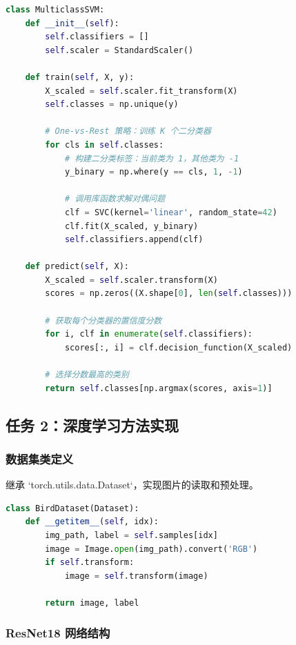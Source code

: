 \documentclass[UTF8]{ctexart}
\begin{document}
\begin{lstlisting}[language=Python, caption=多分类 SVM 实现]
class MulticlassSVM:
    def __init__(self):
        self.classifiers = []
        self.scaler = StandardScaler()

    def train(self, X, y):
        X_scaled = self.scaler.fit_transform(X)
        self.classes = np.unique(y)
        
        # One-vs-Rest 策略：训练 K 个二分类器
        for cls in self.classes:
            # 构建二分类标签：当前类为 1，其他类为 -1
            y_binary = np.where(y == cls, 1, -1)
            
            # 调用库函数求解对偶问题
            clf = SVC(kernel='linear', random_state=42)
            clf.fit(X_scaled, y_binary)
            self.classifiers.append(clf)
            
    def predict(self, X):
        X_scaled = self.scaler.transform(X)
        scores = np.zeros((X.shape[0], len(self.classes)))
        
        # 获取每个分类器的置信度分数
        for i, clf in enumerate(self.classifiers):
            scores[:, i] = clf.decision_function(X_scaled)
            
        # 选择分数最高的类别
        return self.classes[np.argmax(scores, axis=1)]
\end{lstlisting}

\subsection{任务 2：深度学习方法实现}

\subsubsection{数据集类定义}
继承 `torch.utils.data.Dataset`，实现图片的读取和预处理。

\begin{lstlisting}[language=Python, caption=BirdDataset 实现]
class BirdDataset(Dataset):
    def __getitem__(self, idx):
        img_path, label = self.samples[idx]
        image = Image.open(img_path).convert('RGB')
        if self.transform:
            image = self.transform(image)
            
        return image, label
\end{lstlisting}

\subsubsection{ResNet18 网络结构}
\end{document}
